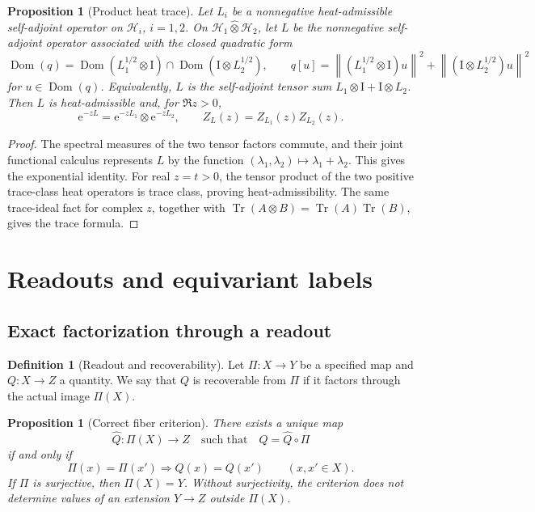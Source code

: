 \documentclass[11pt,a4paper]{article}
\newtheorem{proposition}[theorem]{Proposition}
\theoremstyle{definition}
\newtheorem{definition}[theorem]{Definition}
\theoremstyle{remark}
\newcommand{\Hcal}{\mathcal H}
\newcommand{\Tr}{\operatorname{Tr}}
\newcommand{\Dom}{\operatorname{Dom}}
\newcommand{\Id}{\mathrm I}
\newcommand{\e}{\mathrm e}
\newcommand{\norm}[1]{\left\lVert #1\right\rVert}
\begin{document}
\begin{proposition}[Product heat trace]
Let \(L_i\) be a nonnegative heat-admissible self-adjoint operator on
\(\Hcal_i\), \(i=1,2\). On \(\Hcal_1\widehat\otimes\Hcal_2\), let \(L\) be the
nonnegative self-adjoint operator associated with the closed quadratic form
\[
 \Dom(q)=
 \Dom(L_1^{1/2}\otimes\Id)\cap
 \Dom(\Id\otimes L_2^{1/2}),
\qquad
 q[u]=
 \norm{(L_1^{1/2}\otimes\Id)u}^2+
 \norm{(\Id\otimes L_2^{1/2})u}^2
\]
for \(u\in\Dom(q)\). Equivalently, \(L\) is the self-adjoint tensor sum
\(L_1\otimes\Id+\Id\otimes L_2\).
Then \(L\) is heat-admissible and, for \(\Re z>0\),
\[
 \e^{-zL}=\e^{-zL_1}\otimes\e^{-zL_2},
 \qquad
 Z_L(z)=Z_{L_1}(z)Z_{L_2}(z).
\]
\end{proposition}

\begin{proof}
The spectral measures of the two tensor factors commute, and their joint
functional calculus represents \(L\) by the function
\((\lambda_1,\lambda_2)\mapsto\lambda_1+\lambda_2\). This gives the
exponential identity. For real \(z=t>0\), the tensor product of the two
positive trace-class heat operators is trace class, proving
heat-admissibility. The same trace-ideal fact for complex \(z\), together with
\(\Tr(A\otimes B)=\Tr(A)\Tr(B)\), gives the trace formula.
\end{proof}

\section{Readouts and equivariant labels}

\subsection{Exact factorization through a readout}

\begin{definition}[Readout and recoverability]
Let \(\Pi:X\to Y\) be a specified map and \(Q:X\to Z\) a quantity. We say that
\(Q\) is recoverable from \(\Pi\) if it factors through the actual image
\(\Pi(X)\).
\end{definition}

\begin{proposition}[Correct fiber criterion]
\label{prop:fiber}
There exists a unique map
\[
 \widehat Q:\Pi(X)\longrightarrow Z
\quad\text{such that}\quad
 Q=\widehat Q\circ\Pi
\]
if and only if
\[
 \Pi(x)=\Pi(x')\Longrightarrow Q(x)=Q(x')
 \qquad(x,x'\in X).
\]
If \(\Pi\) is surjective, then \(\Pi(X)=Y\). Without surjectivity, the criterion
does not determine values of an extension \(Y\to Z\) outside \(\Pi(X)\).
\end{proposition}
\end{document}
